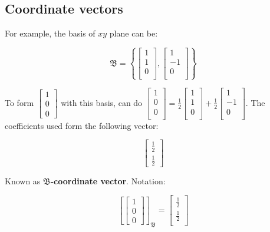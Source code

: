 \subsection{Coordinate vectors}

For example, the basis of $xy$ plane can be:

\[\mathfrak{B}=\left\{\begin{bmatrix} 1\\1\\0\\ \end{bmatrix}, \begin{bmatrix}1\\-1\\0\\ \end{bmatrix}\right\}\]

To form $\begin{bmatrix}1\\ 0\\0\end{bmatrix}$ with this basis, can do $\begin{bmatrix} 1\\0\\0\\ \end{bmatrix}=\frac{1}{2}\begin{bmatrix} 1\\1\\0\\ \end{bmatrix}+\frac{1}{2}\begin{bmatrix}1\\-1\\0\\ \end{bmatrix}$.
The coefficients used form the following vector:

\[\begin{bmatrix}\frac{1}{2}\\ \frac{1}{2}\end{bmatrix}\]

Known as \textbf{$\mathfrak{B}$-coordinate vector}.
Notation:

\[\left[\begin{bmatrix} 1 \\ 0 \\ 0 \end{bmatrix} \right]_\mathfrak{B}=\begin{bmatrix} \frac{1}{2} \\ \frac{1}{2} \\ \end{bmatrix} \]

